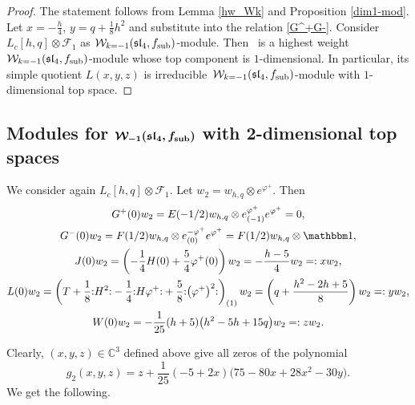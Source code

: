 \documentclass[pdftex]{sigma}
\numberwithin{equation}{section}
\newcommand{\C}{\mathbb C}
\newcommand{\F}{\mathcal F}
\begin{document}
\begin{proof}
	The statement follows from Lemma \ref{hw_Wk} and Proposition \ref{dim1-mod}. Let $x= -\frac{h}{4}$, $ y = q+\frac{1}{8}h^2$ and substitute into the relation \eqref{G^+G-}. Consider $L_c[h,q] \otimes \F_1$ as $\mathcal{W}_{k=-1}(\mathfrak{sl}_4, f_{\rm sub})$-module. Then~ is a highest weight $\mathcal{W}_{k=-1}(\mathfrak{sl}_4, f_{\rm sub})$-module whose top component is $1$-dimensional. In particular, its simple quotient $L(x,y,z)$ is irreducible~${\mathcal{W}_{k=-1}(\mathfrak{sl}_4, f_{\rm sub})}$-module with $1$-dimensional top space.
\end{proof}


\subsection[Modules for W\_-1(sl\_4, f\_sub) with 2-dimensional top spaces]{Modules for $\boldsymbol{\mathcal{W}_{-1}(\mathfrak{sl}_4, f_{\rm sub})}$ with $\boldsymbol{2}$-dimensional top spaces}

We consider again $L_{c} [h,q] \otimes \F_1$. Let $w_2 = w_{h,q} \otimes e^{\varphi^+}$. Then
\begin{gather*}
	G^+ (0) w_2 = E(-1/2) w_{h,q} \otimes e^{\varphi^+}_{(-1)} e^{\varphi^+} =0, \\
 G^- (0) w_2= F(1/2) w_{h,q} \otimes e^{-\varphi^+}_{(0)} e^{\varphi^+} = F(1/2) w_{h,q} \otimes {\mathbbm 1}, \\
J(0) w_{2} = \left(- \frac{1}{4} H(0) + \frac{5}{4} \varphi^+(0) \right) w_2 = - \frac{h - 5}{4} w_2 =: x w_2 , \\
 L(0) w_{2} = \left( T + \frac{1} {8} {:} H^2{:} - \frac{1}{4} {:} H \varphi^+{:} + \frac{5}{8} {:}\bigl(\varphi^+\bigr) ^2{:} \right)_{(1)} w_2
=\left( q + \frac{h^2 - 2h+ 5}{8}\right) w_2 =: y w_2, \\
 W(0) w_2 = - \frac{1}{25} (h+5) \bigl(h^2 - 5 h + 15 q\bigr) w_2 =: z w_2.
\end{gather*}

Clearly, $(x,y,z) \in {\C}^3$ defined above give all zeros of the polynomial
\[
g_2(x,y,z) = z+ \frac{1}{25} (-5 + 2 x) \bigl(75 - 80 x + 28 x^2 - 30 y\bigr).
\]
 We get the following.
\end{document}
